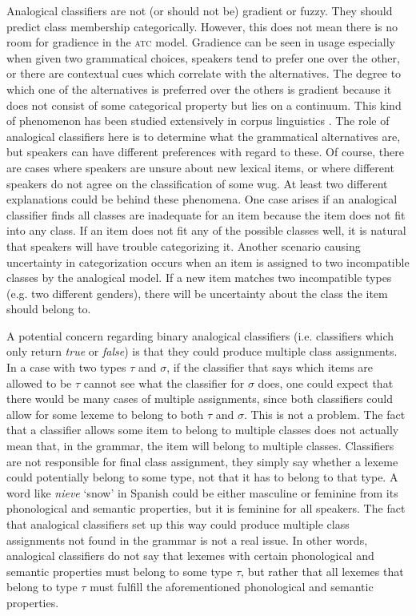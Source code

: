 Analogical classifiers are not (or should not be) gradient or fuzzy. They should predict class membership categorically. However, this does not mean there is no room for gradience in the \textsc{atc} model. Gradience can be seen in usage especially when given two grammatical choices, speakers tend to prefer one over the other, or there are contextual cues which correlate with the alternatives. The degree to which one of the alternatives is preferred over the others is gradient because it does not consist of some categorical property but lies on a continuum. This kind of phenomenon has been studied extensively in corpus linguistics \autocites{Bresnan.2007, Bresnan.2008, Francis.2014, Hay.2006, Kapatsinski.2012}. The role of analogical classifiers here is to determine what the grammatical alternatives are, but speakers can have different preferences with regard to these. Of course, there are cases where speakers are unsure about new lexical items, or where different speakers do not agree on the classification of some wug. At least two different explanations could be behind these phenomena. One case arises if an analogical classifier finds all classes are inadequate for an item because the item does not fit into any class. If an item does not fit any of the possible classes well, it is natural that speakers will have trouble categorizing it. Another scenario causing uncertainty in categorization occurs when an item is assigned to two incompatible classes by the analogical model. If a new item matches two incompatible types (e.g. two different genders), there will be uncertainty about the class the item should belong to.

A potential concern regarding binary analogical classifiers (i.e. classifiers which only return \textit{true} or \textit{false}) is that they could produce multiple class assignments. In a case with two types $\tau$ and $\sigma$, if the classifier that says which items are allowed to be $\tau$ cannot see what the classifier for $\sigma$ does, one could expect that there would be many cases of multiple assignments, since both classifiers could allow for some lexeme to belong to both $\tau$ and $\sigma$. This is not a problem. The fact that a classifier allows some item to belong to multiple classes does not actually mean that, in the grammar, the item will belong to multiple classes. Classifiers are not responsible for final class assignment, they simply say whether a lexeme could potentially belong to some type, not that it has to belong to that type. A word like \textit{nieve} `snow' in Spanish could be either masculine or feminine from its phonological and semantic properties, but it is feminine for all speakers. The fact that analogical classifiers set up this way could produce multiple class assignments not found in the grammar is not a real issue. In other words, analogical classifiers do not say that lexemes with certain phonological and semantic properties must belong to some type $\tau$, but rather that all lexemes that belong to type $\tau$ must fulfill the aforementioned phonological and semantic properties.

